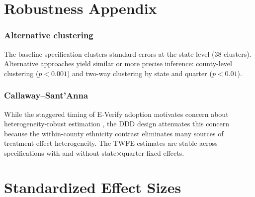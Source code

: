 \documentclass[12pt]{article}
\begin{document}
\section{Robustness Appendix}

\subsubsection*{Alternative clustering} The baseline specification clusters standard errors at the state level (38 clusters). Alternative approaches yield similar or more precise inference: county-level clustering ($p < 0.001$) and two-way clustering by state and quarter ($p < 0.01$).

\subsubsection*{Callaway--Sant'Anna} While the staggered timing of E-Verify adoption motivates concern about heterogeneity-robust estimation \citep{callaway2021}, the DDD design attenuates this concern because the within-county ethnicity contrast eliminates many sources of treatment-effect heterogeneity. The TWFE estimates are stable across specifications with and without state$\times$quarter fixed effects.

\section{Standardized Effect Sizes}
\label{sec:sde}


\end{document}
